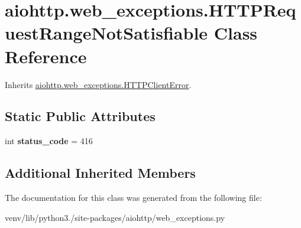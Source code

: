 \hypertarget{classaiohttp_1_1web__exceptions_1_1_h_t_t_p_request_range_not_satisfiable}{}\section{aiohttp.\+web\+\_\+exceptions.\+H\+T\+T\+P\+Request\+Range\+Not\+Satisfiable Class Reference}
\label{classaiohttp_1_1web__exceptions_1_1_h_t_t_p_request_range_not_satisfiable}


Inherits \hyperlink{classaiohttp_1_1web__exceptions_1_1_h_t_t_p_client_error}{aiohttp.\+web\+\_\+exceptions.\+H\+T\+T\+P\+Client\+Error}.

\subsection*{Static Public Attributes}
\begin{DoxyCompactItemize}
\item 
\mbox{\label{classaiohttp_1_1web__exceptions_1_1_h_t_t_p_request_range_not_satisfiable_aec855c31ac58d68e5d4f02212457e7fc}} 
int {\bfseries status\+\_\+code} = 416
\end{DoxyCompactItemize}
\subsection*{Additional Inherited Members}


The documentation for this class was generated from the following file\+:\begin{DoxyCompactItemize}
\item 
venv/lib/python3./site-\/packages/aiohttp/web\+\_\+exceptions.\+py\end{DoxyCompactItemize}

